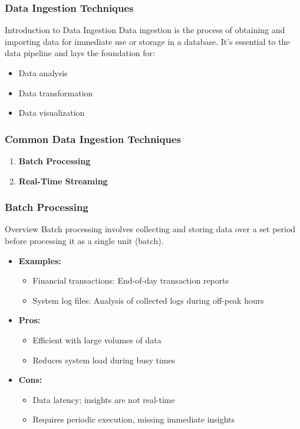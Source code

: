 \documentclass[aspectratio=169]{beamer}
\begin{document}
\begin{frame}[fragile]
  \frametitle{Data Ingestion Techniques}
  \begin{block}{Introduction to Data Ingestion}
    Data ingestion is the process of obtaining and importing data for immediate use or storage in a database. 
    It's essential to the data pipeline and lays the foundation for:
    \begin{itemize}
      \item Data analysis
      \item Data transformation
      \item Data visualization
    \end{itemize}
  \end{block}
\end{frame}

\begin{frame}[fragile]
  \frametitle{Common Data Ingestion Techniques}
  \begin{enumerate}
    \item \textbf{Batch Processing}
    \item \textbf{Real-Time Streaming}
  \end{enumerate}
\end{frame}

\begin{frame}[fragile]
  \frametitle{Batch Processing}
  \begin{block}{Overview}
    Batch processing involves collecting and storing data over a set period before processing it as a single unit (batch).
  \end{block}
  \begin{itemize}
    \item \textbf{Examples:}
    \begin{itemize}
      \item Financial transactions: End-of-day transaction reports
      \item System log files: Analysis of collected logs during off-peak hours
    \end{itemize}
    \item \textbf{Pros:}
    \begin{itemize}
      \item Efficient with large volumes of data
      \item Reduces system load during busy times
    \end{itemize}
    \item \textbf{Cons:}
    \begin{itemize}
      \item Data latency; insights are not real-time
      \item Requires periodic execution, missing immediate insights
    \end{itemize}
  \end{itemize}
\end{frame}
\end{document}

